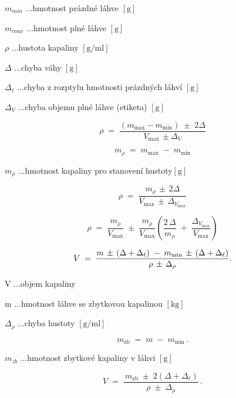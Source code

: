 \(m_{min}\) ...hmotnost prázdné láhve \([\mathrm{g}]\)

\(m_{max}\) ...hmotnost plné láhve \([\mathrm{g}]\)

\(\rho\) ...hustota kapaliny \([\mathrm{g/ml}]\)

\(\Delta\) ...chyba váhy \([\mathrm{g}]\)

\(\Delta_\ell\) ...chyba z rozptylu hmotnosti prázdných láhví \([\mathrm{g}]\)

\(\Delta_V\) ...chyba objemu plné láhve (etiketa) \([\mathrm{g}]\)

\[
\rho \;=\;
\frac{(m_{\max}-m_{\min})\;\pm\;2\Delta}
     {V_{\max}\,\pm\Delta_V}
\]

\[
m_{\rho} \;=\; m_{\max} \;-\; m_{\min}
\]

\(m_{\rho}\) ...hmotnost kapaliny pro stanovení hustoty\([\mathrm{g}]\)

\[
\rho \;=\;
\frac{m_{\rho} \,\pm\, 2\Delta}
     {V_{\max} \,\pm\, \Delta_{V_{\max}}}
\]

\[
\rho \;=\;
\frac{m_{\rho}}{V_{\max}}
\;\pm\;
\frac{m_{\rho}}{V_{\max}}
\left(
   \frac{2\,\Delta}{m_{\rho}} \;+\; \frac{\Delta_{V_{\max}}}{V_{\max}}
\right)
\]

\[
V \;=\;
\frac{%
      m \,\pm\, (\Delta + \Delta_\ell)
      \;-\;
      m_{\min} \,\pm\, (\Delta + \Delta_\ell)
     }{%
      \rho \,\pm\, \Delta_\rho
     }.
\]

V ...objem kapaliny

m ...hmotnost láhve se zbytkovou kapalinou \([\mathrm{kg}]\)

\(\Delta_\rho\) ...chyba hustoty \([\mathrm{g/ml}]\)

\[
m_{\mathrm{zb}} \;=\; m \;-\; m_{\min}\,.
\]

\(m_{zb}\) ...hmotnost zbytkové kapaliny v láhvi \([\mathrm{g}]\)

\[
V \;=\;
\frac{\,m_{\mathrm{zb}} \;\pm\; 2(\Delta + \Delta_\ell)}
     {\rho \;\pm\; \Delta_\rho}\,.
\]

\begin{center}    
\end{center}

\begin{center}  
\end{center}  

